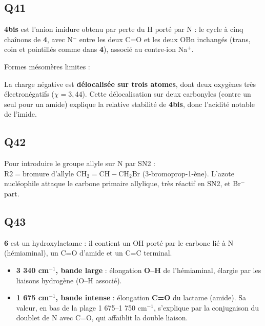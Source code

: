 \documentclass[11pt,a4paper]{article}
\providecommand{\tightlist}{\setlength{\itemsep}{0pt}\setlength{\parskip}{0pt}}
\newcommand{\equationajustee}[1]{%
  \sbox{\boiteequation}{$\displaystyle #1$}%
  \ifdim\wd\boiteequation>\linewidth
    \[\resizebox{\linewidth}{!}{\usebox{\boiteequation}}\]%
  \else
    \[#1\]%
  \fi}
\begin{document}
\hypertarget{q41}{%
\subsection{Q41}\label{q41}}

\textbf{4bis} est l'anion imidure obtenu par perte du H porté par N : le cycle à cinq chaînons de \textbf{4}, avec N\(^-\) entre les deux C=O et les deux OBn inchangés (trans, coin et pointillés comme dans \textbf{4}), associé au contre-ion Na\(^+\).

Formes mésomères limites :

\equationajustee{\begin{aligned}{}&\mathrm{O{=}C{-}\overset{\ominus}{N}{-}C{=}O}\\
\longleftrightarrow\ &\mathrm{{}^{\ominus}O{-}C{=}N{-}C{=}O}\\
\longleftrightarrow\ &\mathrm{O{=}C{-}N{=}C{-}O^{\ominus}}
\end{aligned}}

La charge négative est \textbf{délocalisée sur trois atomes}, dont deux oxygènes très électronégatifs (\(\chi=3{,}44\)). Cette délocalisation sur deux carbonyles (contre un seul pour un amide) explique la relative stabilité de \textbf{4bis}, donc l'acidité notable de l'imide.

\hypertarget{q42}{%
\subsection{Q42}\label{q42}}

Pour introduire le groupe allyle sur N par SN2 : \(\boxed{\mathrm{R2}=\text{bromure d'allyle }\mathrm{CH_2{=}CH{-}CH_2Br}}\) (3-bromoprop-1-ène). L'azote nucléophile attaque le carbone primaire allylique, très réactif en SN2, et Br\(^-\) part.

\hypertarget{q43}{%
\subsection{Q43}\label{q43}}

\textbf{6} est un hydroxylactame : il contient un OH porté par le carbone lié à N (hémiaminal), un C=O d'amide et un C=C terminal.

\begin{itemize}
\tightlist
\item
  \textbf{3 340 cm\(^{-1}\), bande large} : élongation \textbf{O--H} de l'hémiaminal, élargie par les liaisons hydrogène (O--H associé).
\item
  \textbf{1 675 cm\(^{-1}\), bande intense} : élongation \textbf{C=O} du lactame (amide). Sa valeur, en bas de la plage 1 675--1 750 cm\(^{-1}\), s'explique par la conjugaison du doublet de N avec C=O, qui affaiblit la double liaison.
\end{itemize}
\end{document}
